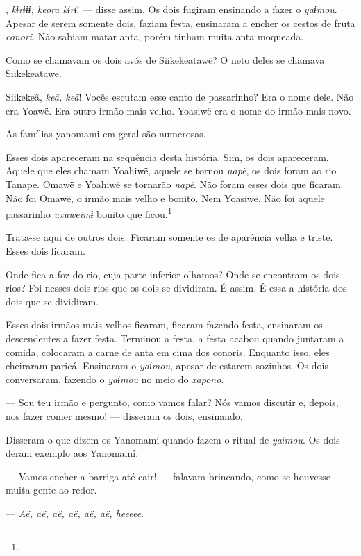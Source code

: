 , \textit{kɨrɨɨɨ, keora kɨrɨ}! --- disse assim. Os dois fugiram ensinando a fazer o \textit{yaɨmou}. Apesar de serem somente dois, faziam festa, ensinaram a encher os cestos de fruta
\textit{conori}. Não sabiam matar anta, porém tinham muita anta moqueada. 

Como se chamavam os dois avós de Siikekeatawë? O neto deles se chamava
Siikekeatawë. 

Siikekeã, \textit{keã, keã}! Vocês escutam esse canto de passarinho? Era o
nome dele. Não era Yoawë. Era outro irmão mais velho. Yoasiwë era o nome
do irmão mais novo. 

As famílias yanomami em geral são numerosas. 

Esses dois apareceram na sequência desta história. Sim, os dois
apareceram. Aquele que eles chamam Yoahiwë, aquele se
tornou \textit{napë}, os dois foram ao rio Tanape. Omawë e Yoahiwë se
tornarão \textit{napë}. Não foram esses dois que ficaram. Não foi Omawë, o
irmão mais velho e bonito. Nem Yoasiwë. Não foi aquele
passarinho \textit{uxuweimɨ} bonito que ficou.\footnote{} 

Trata-se aqui de outros dois. Ficaram somente os de aparência velha e triste. Esses dois ficaram.

Onde fica a foz do rio, cuja parte inferior olhamos? Onde se encontram
os dois rios? Foi nesses dois rios que os dois se dividiram. É assim. É essa 
a história dos dois que se dividiram. 

Esses dois irmãos mais velhos ficaram, ficaram fazendo festa, ensinaram
os descendentes a fazer festa. Terminou a festa, a festa acabou quando
juntaram a comida, colocaram a carne de anta em cima dos conoris.
Enquanto isso, eles cheiraram paricá. Ensinaram o \textit{yaɨmou}, 
apesar de estarem sozinhos. Os dois conversaram, fazendo o \textit{yaɨmou} no meio do \textit{xapono}. 

--- Sou teu irmão e pergunto, como vamos falar? Nós vamos discutir e,
depois, nos fazer comer mesmo! --- disseram os dois, ensinando. 

Disseram o que dizem os Yanomami quando fazem o ritual de \textit{yaɨmou}.
Os dois deram exemplo aos Yanomami. 

--- Vamos encher a barriga até cair! --- falavam brincando, como se
houvesse muita gente ao redor. 

--- \textit{Aë, aë, aë, aë, aë, aë, heeeee}. 

